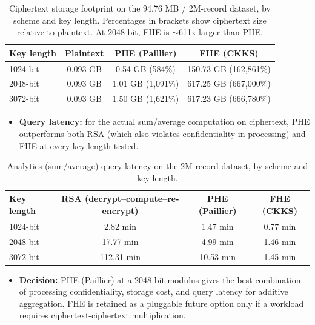 \documentclass[11pt]{article}
\begin{document}
\begin{table}[h]
\centering
\small
\begin{tabular}{lccc}
\toprule
\textbf{Key length} & \textbf{Plaintext} & \textbf{PHE (Paillier)} & \textbf{FHE (CKKS)} \\
\midrule
1024-bit & 0.093 GB & 0.54 GB (584\%) & 150.73 GB (162{,}861\%) \\
2048-bit & 0.093 GB & 1.01 GB (1{,}091\%) & 617.25 GB (667{,}000\%) \\
3072-bit & 0.093 GB & 1.50 GB (1{,}621\%) & 617.23 GB (666{,}780\%) \\
\bottomrule
\end{tabular}
\caption{Ciphertext storage footprint on the 94.76 MB / 2M-record dataset, by scheme and key length. Percentages in brackets show ciphertext size relative to plaintext. At 2048-bit, FHE is $\sim$611x larger than PHE.}
\label{tab:storage}
\end{table}

\begin{itemize}[leftmargin=1.5em]
    \item \textbf{Query latency:} for the actual sum/average computation on ciphertext, PHE outperforms both RSA (which also violates confidentiality-in-processing) and FHE at every key length tested.
\end{itemize}

\begin{table}[h]
\centering
\small
\begin{tabular}{lccc}
\toprule
\textbf{Key length} & \textbf{RSA (decrypt--compute--re-encrypt)} & \textbf{PHE (Paillier)} & \textbf{FHE (CKKS)} \\
\midrule
1024-bit & 2.82 min & 1.47 min & 0.77 min \\
2048-bit & 17.77 min & 4.99 min & 1.46 min \\
3072-bit & 112.31 min & 10.53 min & 1.45 min \\
\bottomrule
\end{tabular}
\caption{Analytics (sum/average) query latency on the 2M-record dataset, by scheme and key length.}
\label{tab:query_latency}
\end{table}

\begin{itemize}[leftmargin=1.5em]
    \item \textbf{Decision:} PHE (Paillier) at a 2048-bit modulus gives the best combination of processing confidentiality, storage cost, and query latency for additive aggregation. FHE is retained as a pluggable future option only if a workload requires ciphertext-ciphertext multiplication.
\end{itemize}
\end{document}
